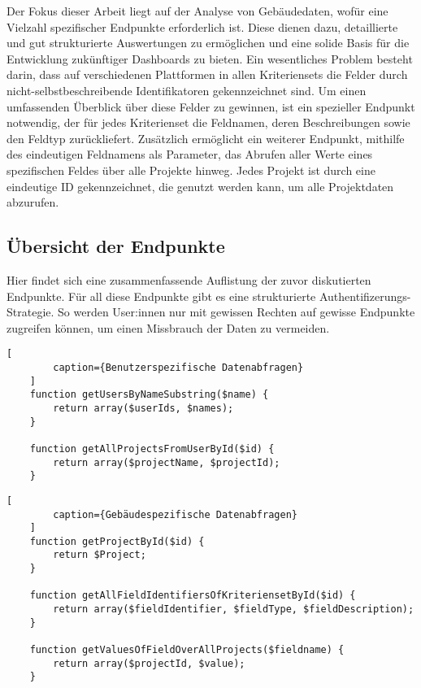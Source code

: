 \documentclass[draft,final]{vutinfth} %
\begin{document}
Der Fokus dieser Arbeit liegt auf der Analyse von Gebäudedaten, wofür eine Vielzahl spezifischer Endpunkte erforderlich ist. 
Diese dienen dazu, detaillierte und gut strukturierte Auswertungen zu ermöglichen und eine solide Basis für die Entwicklung zukünftiger Dashboards zu bieten. 
Ein wesentliches Problem besteht darin, dass auf verschiedenen Plattformen in allen Kriteriensets die Felder durch nicht-selbstbeschreibende Identifikatoren gekennzeichnet sind. 
Um einen umfassenden Überblick über diese Felder zu gewinnen, ist ein spezieller Endpunkt notwendig, der für jedes Kriterienset die Feldnamen, deren Beschreibungen sowie den Feldtyp zurückliefert. 
Zusätzlich ermöglicht ein weiterer Endpunkt, mithilfe des eindeutigen Feldnamens als Parameter, das Abrufen aller Werte eines spezifischen Feldes über alle Projekte hinweg.
Jedes Projekt ist durch eine eindeutige ID gekennzeichnet, die genutzt werden kann, um alle Projektdaten abzurufen.


\subsection{Übersicht der Endpunkte}

Hier findet sich eine zusammenfassende Auflistung der zuvor diskutierten Endpunkte.
Für all diese Endpunkte gibt es eine strukturierte Authentifizerungs-Strategie. 
So werden User:innen nur mit gewissen Rechten auf gewisse Endpunkte zugreifen können, um einen Missbrauch der Daten zu vermeiden.

\begin{lstlisting}[
		caption={Benutzerspezifische Datenabfragen}
	]
	function getUsersByNameSubstring($name) {
		return array($userIds, $names);
	}
	
	function getAllProjectsFromUserById($id) {
		return array($projectName, $projectId);
	}
\end{lstlisting}

\begin{lstlisting}[
		caption={Gebäudespezifische Datenabfragen}
	]
	function getProjectById($id) {
		return $Project;
	}
	
	function getAllFieldIdentifiersOfKriteriensetById($id) {
		return array($fieldIdentifier, $fieldType, $fieldDescription);
	}
	
	function getValuesOfFieldOverAllProjects($fieldname) {
		return array($projectId, $value);
	}
	
\end{lstlisting}

\end{document}
